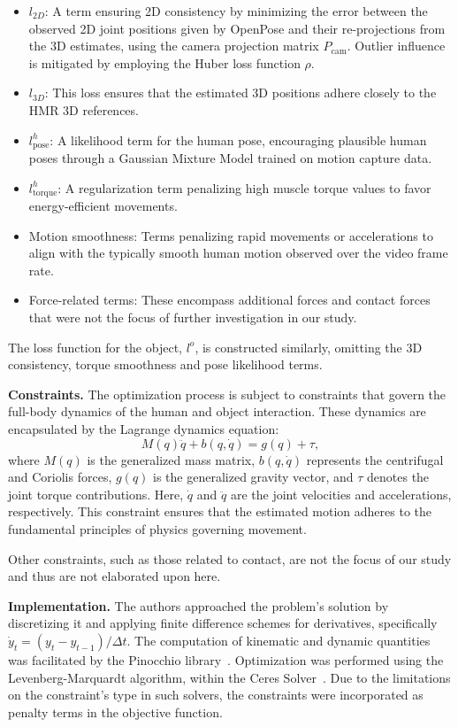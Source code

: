\begin{itemize}
    \item 
        \(l_{2D}\): A term ensuring 2D consistency by minimizing the error between the observed 2D joint positions given by OpenPose and 
        their re-projections from the 3D estimates, using the camera projection matrix \(P_{\text{cam}}\). Outlier influence is mitigated 
        by employing the Huber loss function \(\rho\).
    \item 
        \(l_{3D}\): This loss ensures that the estimated 3D positions adhere closely to the HMR 3D references.
    \item 
        \(l_{\text{pose}}^h\): A likelihood term for the human pose, encouraging plausible human poses through a Gaussian Mixture Model 
        trained on motion capture data.
    \item
        \(l_{\text{torque}}^h\): A regularization term penalizing high muscle torque values to favor energy-efficient movements.
    \item 
        Motion smoothness: Terms penalizing rapid movements or accelerations to align with the typically smooth human motion observed over 
        the video frame rate.
    \item
        Force-related terms: These encompass additional forces and contact forces that were not the focus of further investigation in our 
        study.
\end{itemize}

The loss function for the object, \(l^o\), is constructed similarly, omitting the 3D consistency, torque smoothness and pose likelihood terms.

\noindent\textbf{Constraints.} The optimization process is subject to constraints that govern the full-body dynamics of the human and object 
interaction. These dynamics are encapsulated by the Lagrange dynamics equation:
\[
M(q)\ddot{q} + b(q, \dot{q}) = g(q) + \tau,
\]
where \( M(q) \) is the generalized mass matrix, \( b(q, \dot{q}) \) represents the centrifugal and Coriolis forces, \( g(q) \) is the 
generalized gravity vector, and \( \tau \) denotes the joint torque contributions. Here, \( \dot{q} \) and \( \ddot{q} \) are the joint 
velocities and accelerations, respectively. This constraint ensures that the estimated motion adheres to the fundamental principles of physics 
governing movement.

Other constraints, such as those related to contact, are not the focus of our study and thus are not elaborated upon here.

\noindent\textbf{Implementation.} The authors approached the problem's solution by discretizing it and applying finite difference schemes 
for derivatives, specifically \(\dot{y}_t = (y_t - y_{t - 1}) / \Delta t\). The computation of kinematic and dynamic quantities was facilitated 
by the Pinocchio library~\cite{carpentier2019pinocchio}. Optimization was performed using the Levenberg-Marquardt algorithm, within the Ceres 
Solver~\cite{Agarwal_Ceres_Solver_2022}. Due to the limitations on the constraint's type in such solvers, the constraints were incorporated as 
penalty terms in the objective function.
